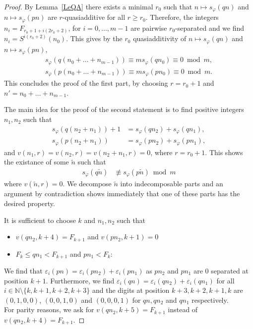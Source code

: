 \documentclass[12pt]{amsart}
\begin{document}
\begin{proof}
  
By Lemma~\ref{LeQA} there exists a minimal $r_0$ such that $n\mapsto s_\varphi(qn)$ and $n\mapsto s_\varphi(pn)$ are $r$-quasiadditive for all $r\geq r_0$.
Therefore, the integers $n_i = F_{r_0+1+ i(2r_0+2)}$, for $i=0,\ldots,m-1$ are pairwise $r_0$-separated and we find $n_i = S^{i(r_0+2)}(n_0)$.
This gives by the $r_0$ quasiadditivity of $n\mapsto s_\varphi(qn)$ and $n\mapsto s_\varphi(pn)$,
  \begin{align*}
    s_{\varphi}(q(n_0+\ldots+n_{m-1})) \equiv m s_{\varphi}(q n_0) \equiv 0 \bmod m,\\
    s_{\varphi}(p(n_0+\ldots+n_{m-1})) \equiv m s_{\varphi}(p n_0) \equiv 0 \bmod m.
  \end{align*}
This concludes the proof of the first part, by choosing $r=r_0+1$ and $n' = n_0 + \ldots + n_{m-1}$.

  The main idea for the proof of the second statement is to find positive integers $n_1,n_2$ such that
  \begin{align*}
    s_\varphi(q(n_2+n_1)) + 1 &= s_\varphi(q n_2) + s_\varphi(q n_1),\\
    s_\varphi(p(n_2+n_1)) &= s_\varphi(p n_2) + s_\varphi(p n_1),
  \end{align*}
   and $v(n_1,r) = v(n_2,r) = v(n_2+n_1,r) = 0$, where $r = r_0+1$.
   This shows the existance of some $\tilde{n}$ such that
   \begin{align*}
      s_\varphi(q\tilde{n}) &\not \equiv s_\varphi(p\tilde{n}) \bmod m
   \end{align*}
   where $v(\tilde{n},r) = 0$. 
   We decompose $\tilde{n}$ into indecomposable parts and an argument by contradiction shows immediately that one of these parts has the desired property.
   
   It is sufficient to choose $k$ and $n_1,n_2$ such that 
   \begin{itemize}
    \item  $v(qn_2,k+4) = F_{k+1}$ and $v(pn_2,k+1) = 0$
    \item  $F_k \leq q n_1 < F_{k+1}$ and $p n_1 < F_k$:
   \end{itemize}
   We find that $\varepsilon_i(pn) = \varepsilon_i(p n_2) + \varepsilon_i(p n_1)$ as $pn_2$ and $pn_1$ are $0$ separated at position $k+1$.
   Furthermore, we find $\varepsilon_i(qn) = \varepsilon_i(q n_2) + \varepsilon_i(q n_1)$ for all $i \in \mathbb{N} \setminus\{k,k+1,k+2,k+3\}$ and the digits at position $k+3,k+2,k+1,k$ 
   are $(0,1,0,0)$, $(0,0,1,0)$ and $(0,0,0,1)$ for $qn, qn_2$ and $qn_1$ respectively.\\
   For parity reasons, we ask for $v(qn_2,k+5) = F_{k+1}$ instead of $v(q n_2, k+4) = F_{k+1}$.
  

\end{proof}
\end{document}
